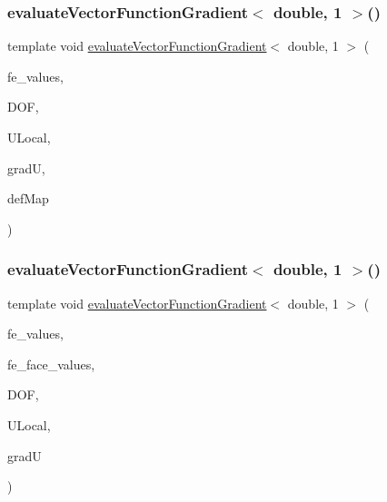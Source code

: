 \mbox{\label{function_evaluations_8cc_a62dbc9fdef114b76a143e86bb1c6df96}} 
\subsubsection{\texorpdfstring{evaluate\+Vector\+Function\+Gradient$<$ double, 1 $>$()}{evaluateVectorFunctionGradient< double, 1 >()}\hspace{0.1cm}{\footnotesize\ttfamily [2/4]}}
{\footnotesize\ttfamily template void \mbox{\hyperlink{group___evaluation_functions_ga9608539d601a91aff1ba01ccc720fbe0}{evaluate\+Vector\+Function\+Gradient}}$<$ double, 1 $>$ (\begin{DoxyParamCaption}\item[{const F\+E\+Values$<$ 1 $>$ \&}]{fe\+\_\+values,  }\item[{unsigned int}]{D\+OF,  }\item[{Table$<$ 1, double $>$ \&}]{U\+Local,  }\item[{Table$<$ 3, double $>$ \&}]{gradU,  }\item[{\mbox{\hyperlink{structdeformation_map}{deformation\+Map}}$<$ double, 1 $>$ \&}]{def\+Map }\end{DoxyParamCaption})}

\mbox{\label{function_evaluations_8cc_ac57e06f570eda3571e00912325612971}} 
\subsubsection{\texorpdfstring{evaluate\+Vector\+Function\+Gradient$<$ double, 1 $>$()}{evaluateVectorFunctionGradient< double, 1 >()}\hspace{0.1cm}{\footnotesize\ttfamily [3/4]}}
{\footnotesize\ttfamily template void \mbox{\hyperlink{group___evaluation_functions_ga9608539d601a91aff1ba01ccc720fbe0}{evaluate\+Vector\+Function\+Gradient}}$<$ double, 1 $>$ (\begin{DoxyParamCaption}\item[{const F\+E\+Values$<$ 1 $>$ \&}]{fe\+\_\+values,  }\item[{const F\+E\+Face\+Values$<$ 1 $>$ \&}]{fe\+\_\+face\+\_\+values,  }\item[{unsigned int}]{D\+OF,  }\item[{Table$<$ 1, double $>$ \&}]{U\+Local,  }\item[{Table$<$ 3, double $>$ \&}]{gradU }\end{DoxyParamCaption})}

